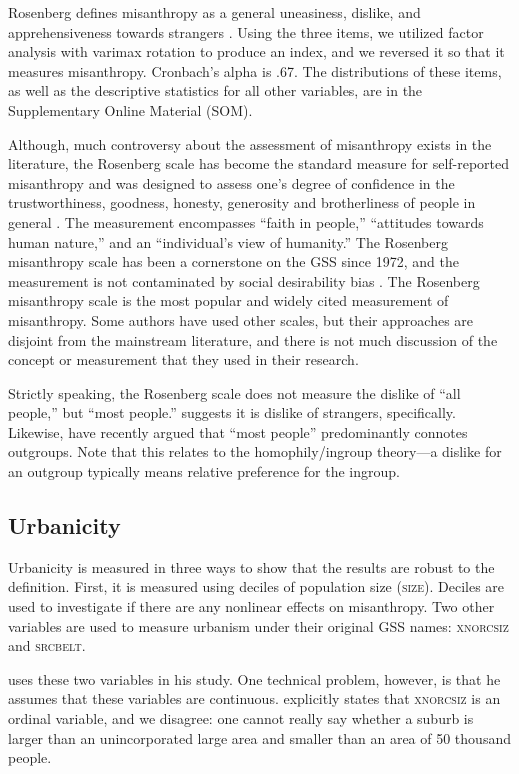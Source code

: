 \documentclass[11pt, letterpaper]{article}
\begin{document}
\begin{spacing}{1.4}
Rosenberg defines misanthropy as a general uneasiness, dislike, and
apprehensiveness towards strangers \citep{rosenberg56}. Using the three items,
we utilized factor analysis with varimax rotation to produce an index, and we
reversed it so that it measures misanthropy. Cronbach's alpha is .67. The
distributions of these items, as well as the descriptive statistics for all other variables, are in the Supplementary Online Material (SOM).

 Although, much controversy about the assessment of misanthropy exists in the
 literature, the Rosenberg scale has become the standard measure for
 self-reported misanthropy and was designed to assess one's degree of confidence
 in the trustworthiness, goodness, honesty, generosity and brotherliness of
 people in general \citep{rosenberg56}. The measurement encompasses ``faith in
 people,'' ``attitudes towards human nature,'' and an ``individual's view of
 humanity.'' The Rosenberg misanthropy scale has been a cornerstone on the GSS since 1972, and the measurement is not contaminated by social desirability bias \citep{ray81}. 
 The Rosenberg misanthropy scale is the most popular and widely cited measurement of misanthropy. Some authors \citep[e.g.,][]{wuensch2002misanthropy} have used other scales, but their approaches are disjoint from the mainstream literature, and there is not much discussion of the concept or measurement that they used in their research.  

Strictly speaking, the Rosenberg scale does not measure the dislike of ``all people,'' but ``most people.'' \citet{wilson85} suggests it is dislike of strangers, specifically. Likewise, \citet{delhey11} have recently argued that ``most people'' predominantly connotes outgroups. Note that this relates to the homophily/ingroup theory---a dislike for an outgroup typically means relative preference for the ingroup. 
 
\subsection*{Urbanicity}

Urbanicity is measured in three ways to show that the
results are robust to the definition. First, it is measured using deciles of population size
(\textsc{size}). Deciles are used to investigate if there are any nonlinear
effects on misanthropy. Two other variables are used to measure urbanism under
their original GSS names: \textsc{xnorcsiz} and \textsc{srcbelt}.

{\citet{wilson85} uses these two variables in his study. One technical problem,
  however, is that he assumes that these variables are
  continuous. \citet{wilson85} explicitly states that \textsc{xnorcsiz} is an ordinal
  variable, and we disagree: one cannot really say whether a suburb is larger
  than an unincorporated large area and smaller than an area of 50 thousand
  people.}


\end{spacing}
\end{document}
